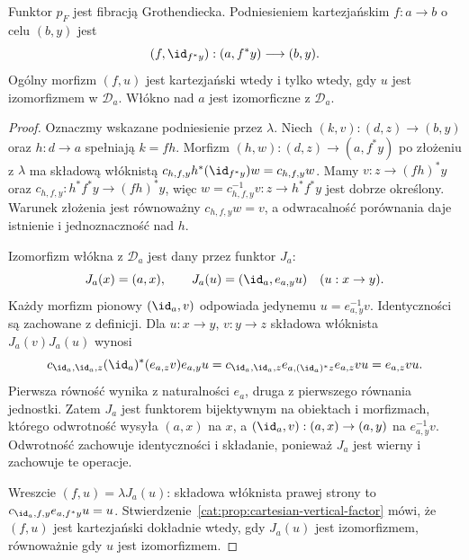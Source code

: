 \begin{twierdzenie}\label{cat:thm:grothendieck-construction-fibration}
Funktor $p_F$ jest fibracją Grothendiecka. Podniesieniem kartezjańskim $f:a\to b$ o celu $(b,y)$ jest
\[
 (f,\id_{f^*y}):(a,f^*y)\longrightarrow(b,y).
\]
Ogólny morfizm $(f,u)$ jest kartezjański wtedy i tylko wtedy, gdy $u$ jest izomorfizmem w $\mathcal D_a$. Włókno nad $a$ jest izomorficzne z $\mathcal D_a$.
\end{twierdzenie}
\begin{proof}
Oznaczmy wskazane podniesienie przez $\lambda$. Niech $(k,v):(d,z)\to(b,y)$ oraz $h:d\to a$ spełniają $k=fh$. Morfizm $(h,w):(d,z)\to(a,f^*y)$ po złożeniu z $\lambda$ ma składową włóknistą
$c_{h,f,y}h^*(\id_{f^*y})w=c_{h,f,y}w$.
Mamy $v:z\to (fh)^*y$ oraz $c_{h,f,y}:h^*f^*y\to(fh)^*y$, więc $w=c_{h,f,y}^{-1}v:z\to h^*f^*y$ jest dobrze określony. Warunek złożenia jest równoważny $c_{h,f,y}w=v$, a odwracalność porównania daje istnienie i jednoznaczność nad $h$.

Izomorfizm włókna z $\mathcal D_a$ jest dany przez funktor $J_a$:
\[
 J_a(x)=(a,x),\qquad
 J_a(u)=(\id_a,e_{a,y}u)\quad(u:x\to y).
\]
Każdy morfizm pionowy $(\id_a,v)$ odpowiada jedynemu $u=e_{a,y}^{-1}v$. Identyczności są zachowane z definicji. Dla $u:x\to y$, $v:y\to z$ składowa włóknista $J_a(v)J_a(u)$ wynosi
\[
 c_{\id_a,\id_a,z}(\id_a)^*(e_{a,z}v)e_{a,y}u
 =c_{\id_a,\id_a,z}e_{a,(\id_a)^*z}e_{a,z}vu
 =e_{a,z}vu.
\]
Pierwsza równość wynika z naturalności $e_a$, druga z pierwszego równania jednostki. Zatem $J_a$ jest funktorem bijektywnym na obiektach i morfizmach, którego odwrotność wysyła $(a,x)$ na $x$, a $(\id_a,v):(a,x)\to(a,y)$ na $e_{a,y}^{-1}v$. Odwrotność zachowuje identyczności i składanie, ponieważ $J_a$ jest wierny i zachowuje te operacje.

Wreszcie $(f,u)=\lambda J_a(u)$: składowa włóknista prawej strony to $c_{\id_a,f,y}e_{a,f^*y}u=u$. Stwierdzenie~\ref{cat:prop:cartesian-vertical-factor} mówi, że $(f,u)$ jest kartezjański dokładnie wtedy, gdy $J_a(u)$ jest izomorfizmem, równoważnie gdy $u$ jest izomorfizmem.
\end{proof}


